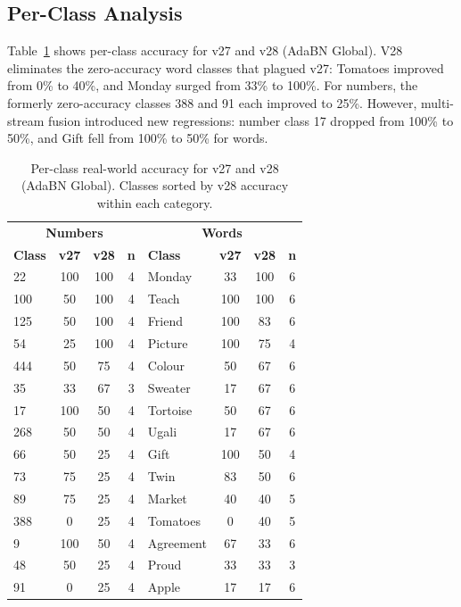 \documentclass[conference]{IEEEtran}
\begin{document}
\subsection{Per-Class Analysis}

Table~\ref{tab:perclass} shows per-class accuracy for v27 and v28 (AdaBN Global). V28 eliminates the zero-accuracy word classes that plagued v27: Tomatoes improved from 0\% to 40\%, and Monday surged from 33\% to 100\%. For numbers, the formerly zero-accuracy classes 388 and 91 each improved to 25\%. However, multi-stream fusion introduced new regressions: number class 17 dropped from 100\% to 50\%, and Gift fell from 100\% to 50\% for words.

\begin{table}[t]
\centering
\caption{Per-class real-world accuracy for v27 and v28 (AdaBN Global). Classes sorted by v28 accuracy within each category.}
\label{tab:perclass}
\small
\begin{tabular}{@{}lccc|lccc@{}}
\toprule
\multicolumn{4}{c|}{\textbf{Numbers}} & \multicolumn{4}{c}{\textbf{Words}} \\
\textbf{Class} & \textbf{v27} & \textbf{v28} & \textbf{n} & \textbf{Class} & \textbf{v27} & \textbf{v28} & \textbf{n} \\
\midrule
22 & 100 & 100 & 4 & Monday & 33 & 100 & 6 \\
100 & 50 & 100 & 4 & Teach & 100 & 100 & 6 \\
125 & 50 & 100 & 4 & Friend & 100 & 83 & 6 \\
54 & 25 & 100 & 4 & Picture & 100 & 75 & 4 \\
444 & 50 & 75 & 4 & Colour & 50 & 67 & 6 \\
35 & 33 & 67 & 3 & Sweater & 17 & 67 & 6 \\
17 & 100 & 50 & 4 & Tortoise & 50 & 67 & 6 \\
268 & 50 & 50 & 4 & Ugali & 17 & 67 & 6 \\
66 & 50 & 25 & 4 & Gift & 100 & 50 & 4 \\
73 & 75 & 25 & 4 & Twin & 83 & 50 & 6 \\
89 & 75 & 25 & 4 & Market & 40 & 40 & 5 \\
388 & 0 & 25 & 4 & Tomatoes & 0 & 40 & 5 \\
9 & 100 & 50 & 4 & Agreement & 67 & 33 & 6 \\
48 & 50 & 25 & 4 & Proud & 33 & 33 & 3 \\
91 & 0 & 25 & 4 & Apple & 17 & 17 & 6 \\
\bottomrule
\end{tabular}
\end{table}
\end{document}
